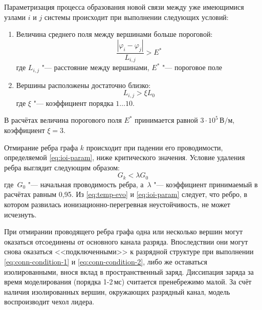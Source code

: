  Параметризация процесса образования новой связи между уже имеющимися узлами $i$ и $j$ системы происходит при выполнении следующих условий:
\begin{enumerate}
	\item Величина среднего поля между вершинами больше пороговой:
	\begin{equation}
		\frac{|\varphi_i - \varphi_j|}{L_{i,j}} > E^*
		\label{eq:conn-condition-1}
	\end{equation}
	где $L_{i,j}$ "--- расстояние между вершинами, $E^*$ "--- пороговое поле
	\item Вершины расположены достаточно близко:
	\begin{equation}
		L_{i,j} > \xi L_0
		\label{eq:conn-condition-2}
	\end{equation}
	где $\xi$ "--- коэффициент порядка $1\ldots10$.
\end{enumerate}
В расчётах величина порогового поля $E^*$ принимается равной $3\cdot10^5\,\text{В}/\text{м}$, коэффициент $\xi = 3$.

 Отмирание ребра графа $k$ происходит при падении его проводимости, определяемой \eqref{eq:ioi-param}, ниже критического значения. Условие удаления ребра выглядит следующим образом:
\begin{equation}
	G_k < \lambda G_0
\end{equation}
где~$G_0$ "--- начальная проводимость ребра, а~$\lambda$ "--- коэффициент принимаемый в расчётах равным 0,95. Из 	\eqref{eq:temp-evo} и \eqref{eq:ioi-param} следует, что ребро, в котором развилась ионизационно-перегревная неустойчивость, не может исчезнуть.

При отмирании проводящего ребра графа одна или несколько вершин могут оказаться отсоединены от основного канала разряда. Впоследствии они могут снова оказаться <<подключенными>> к разрядной структуре при выполнении \eqref{eq:conn-condition-1} и \eqref{eq:conn-condition-2}, либо же оставаться изолированными, внося вклад в пространственный заряд. Диссипация заряда за время моделирования (порядка 1-2\,мс) считается пренебрежимо малой. За счёт наличия изолированных вершин, окружающих разрядный канал, модель воспроизводит чехол лидера.

